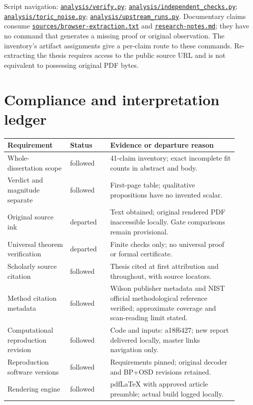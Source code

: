 \documentclass[11pt]{article}
\begin{document}
Script navigation: \href{https://github.com/alectionary/vibe-math/blob/master/formalization/quintavalle-hgp/analysis/verify.py}{\nolinkurl{analysis/verify.py}}; \href{https://github.com/alectionary/vibe-math/blob/master/formalization/quintavalle-hgp/analysis/independent_checks.py}{\nolinkurl{analysis/independent_checks.py}}; \href{https://github.com/alectionary/vibe-math/blob/master/formalization/quintavalle-hgp/analysis/toric_noise.py}{\nolinkurl{analysis/toric_noise.py}}; \href{https://github.com/alectionary/vibe-math/blob/master/formalization/quintavalle-hgp/analysis/upstream_runs.py}{\nolinkurl{analysis/upstream_runs.py}}. Documentary claims consume \href{https://github.com/alectionary/vibe-math/blob/master/formalization/quintavalle-hgp/sources/browser-extraction.txt}{\nolinkurl{sources/browser-extraction.txt}} and \href{https://github.com/alectionary/vibe-math/blob/master/formalization/quintavalle-hgp/research-notes.md}{\nolinkurl{research-notes.md}}; they have no command that generates a missing proof or original observation. The inventory's artifact assignments give a per-claim route to these commands. Re-extracting the thesis requires access to the public source URL and is not equivalent to possessing original PDF bytes.

\section{Compliance and interpretation ledger}
\begin{longtable}{p{0.25\linewidth}p{0.16\linewidth}p{0.51\linewidth}}
\toprule Requirement & Status & Evidence or departure reason\\\midrule
Whole-dissertation scope & followed & 41-claim inventory; exact incomplete fit counts in abstract and body.\\
Verdict and magnitude separate & followed & First-page table; qualitative propositions have no invented scalar.\\
Original source ink & departed & Text obtained; original rendered PDF inaccessible locally. Gate comparisons remain provisional.\\
Universal theorem verification & departed & Finite checks only; no universal proof or formal certificate.\\
Scholarly source citation & followed & Thesis cited at first attribution and throughout, with source locators.\\
Method citation metadata & followed & Wilson publisher metadata and NIST official methodological reference verified; approximate coverage and scan-reading limit stated.\\
Computational reproduction revision & followed & Code and inputs: a18f6427; new report delivered locally, master links navigation only.\\
Reproduction software versions & followed & Requirements pinned; original decoder and BP+OSD revisions retained.\\
Rendering engine & followed & pdfLaTeX with approved article preamble; actual build logged locally.\\
\bottomrule\end{longtable}

\end{document}
